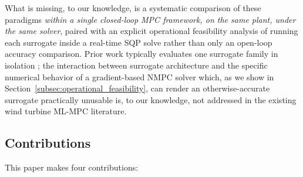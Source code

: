 What is missing, to our knowledge, is a systematic comparison of these
paradigms \emph{within a single closed-loop MPC framework, on the same
plant, under the same solver}, paired with an explicit operational
feasibility analysis of running each surrogate inside a real-time SQP
solve rather than only an open-loop accuracy comparison. Prior work
typically evaluates one surrogate family in isolation
\citep{klein2024,kocijan2004,hewing2020}; the interaction between
surrogate architecture and the specific numerical behavior of a
gradient-based NMPC solver which, as we show in
Section~\ref{subsec:operational_feasibility}, can render an
otherwise-accurate surrogate practically unusable is, to our knowledge,
not addressed in the existing wind turbine ML-MPC literature.

\subsection{Contributions}
\label{subsec:contributions}

This paper makes four contributions:

